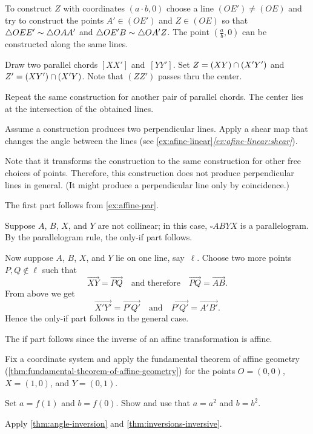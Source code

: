\begin{multicols}{2}
To construct $Z$ with coordinates $(a\cdot b,0)$
choose a line $(OE')\ne (OE)$
and try to construct the points $A'\in (OE')$
and $Z \in(OE)$
so that 
$\triangle OEE'\z\sim \triangle OAA'$ and $\triangle OE'B\z\sim \triangle OA'Z$.
The point $(\tfrac ab,0)$ can be constructed along the same lines.

Draw two parallel chords $[XX']$ and~$[YY']$.
Set $Z\z=(XY)\z\cap (X'Y')$ and $Z'\z= (XY')\cap (X'Y)$.
Note that $(ZZ')$ passes thru the center.

Repeat the same construction for another pair of parallel chords.
The center lies at the intersection of the obtained lines.

Assume a construction produces two perpendicular lines.
Apply a shear map that changes the angle between the lines (see \ref{ex:afine-linear}\textit{\ref{ex:afine-linear:shear}}).

Note that it transforms the construction to the same construction for other free choices of points.
Therefore, this construction does not produce perpendicular lines in general.
(It might produce a perpendicular line only by coincidence.)
 
The first part follows from \ref{ex:affine-par}.

Suppose $A$, $B$, $X$, and $Y$ are not collinear;
in this case, $\square ABYX$ is a parallelogram.
By the parallelogram rule, the only-if part follows.

Now suppose $A$, $B$, $X$, and $Y$ lie on one line, say~$\ell$.
Choose two more points $P,Q\notin\ell$ such that 
\[\overrightarrow{XY}=\overrightarrow{PQ}
\quad\text{and therefore}\quad 
\overrightarrow{PQ}=\overrightarrow{AB}.\]
From above we get 
\[\overrightarrow{X'Y'}=\overrightarrow{P'Q'}
\quad\text{and}\quad 
\overrightarrow{P'Q'}=\overrightarrow{A'B'}.\]
Hence the only-if part follows in the general case.

The if part follows since the inverse of an affine transformation is affine.
 
Fix a coordinate system and apply the fundamental theorem of affine geometry (\ref{thm:fundamental-theorem-of-affine-geometry}) for the points $O=(0,0)$, $X=(1,0)$, and $Y=(0,1)$.

 Set $a=f(1)$ and $b=f(0)$.
Show and use that $a=a^2$ and $b=b^2$.
 
Apply \ref{thm:angle-inversion} and \ref{thm:inversions-inversive}.
 

\end{multicols}
